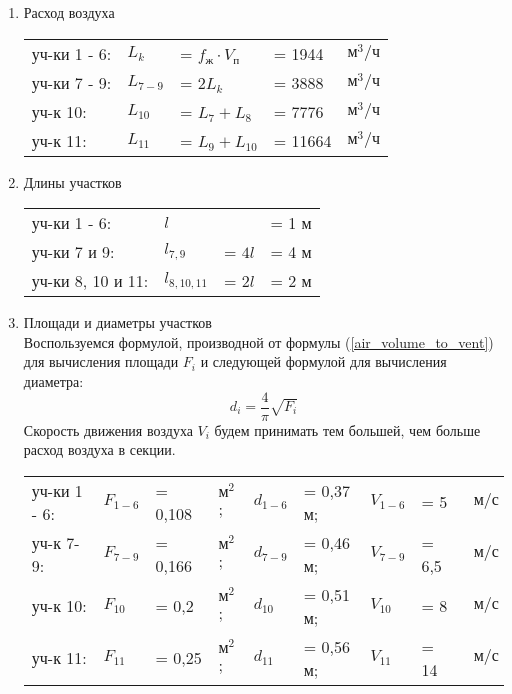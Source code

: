 \begin{enumerate}
    \item   Расход воздуха \\
            \begin{tabular}{lllll}
                уч-ки 1 - 6:    & $L_k $    & = $f_\text{ж} \cdot V_\text{п}$   & = 1944    & $\text{м}^3 / \text{ч}$ \\
                уч-ки 7 - 9:    & $L_{7-9}$ & = $2 L_k$                         & = 3888    & $\text{м}^3 / \text{ч}$ \\
                уч-к 10:        & $L_{10}$  & = $L_{7} + L_{8}$                 & = 7776    & $\text{м}^3 / \text{ч}$ \\
                уч-к 11:        & $L_{11}$  & = $L_{9} + L_{10}$                & = 11664   & $\text{м}^3 / \text{ч}$ \\
            \end{tabular}

    \item   Длины участков \\
            \begin{tabular}{llll}
                уч-ки 1 - 6:        & $l$           &           & = 1 м \\
                уч-ки 7 и 9:        & $l_{7,9}$     & = $4 l$   & = 4 м \\
                уч-ки 8, 10 и 11:   & $l_{8,10,11}$ & = $2 l$   & = 2 м \\
            \end{tabular}

    \item   Площади и диаметры участков \\
            Воспользуемся формулой, производной от формулы (\ref{air_volume_to_vent})
            для вычисления площади $F_i$ и следующей формулой для вычисления диаметра:
            \begin{equation}
            \label{vent_section_d}
                d_i = \frac{4}{\pi} \sqrt{F_i}
            \end{equation}
            Скорость движения воздуха $V_i$ будем принимать тем большей, чем больше
            расход воздуха в секции. \\
            \begin{tabular}{lllllllll}
                уч-ки 1 - 6:    & $F_{1-6}$ & = 0,108   & $\text{м}^2$; & $d_{1-6}$ & = 0,37 м; & $V_{1-6}$ & = 5   & $\text{ м/с}$     \\
                уч-к 7-9:       & $F_{7-9}$ & = 0,166   & $\text{м}^2$; & $d_{7-9}$ & = 0,46 м; & $V_{7-9}$   & = 6,5 & $\text{ м/с}$   \\
                уч-к 10:        & $F_{10}$  & = 0,2     & $\text{м}^2$; & $d_{10}$  & = 0,51 м; & $V_{10}$  & = 8   & $\text{ м/с}$     \\
                уч-к 11:        & $F_{11}$  & = 0,25    & $\text{м}^2$; & $d_{11}$  & = 0,56 м; & $V_{11}$  & = 14  & $\text{ м/с}$     \\
            \end{tabular}


\end{enumerate}
